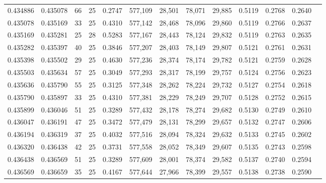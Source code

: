\begin{tabular}{rrrrrrrrrrrrr}
0.434886 & 0.435078 &    66 &  25 &                                     0.2747 & 577,109 &  28,501 &  78,071 &  29,885 & 0.5119 & 0.2768 & 0.2640 \\
0.435078 & 0.435169 &    33 &  25 &                                     0.4310 & 577,142 &  28,468 &  78,096 &  29,860 & 0.5119 & 0.2766 & 0.2637 \\
0.435169 & 0.435281 &    25 &  28 &                                     0.5283 & 577,167 &  28,443 &  78,124 &  29,832 & 0.5119 & 0.2763 & 0.2635 \\
0.435282 & 0.435397 &    40 &  25 &                                     0.3846 & 577,207 &  28,403 &  78,149 &  29,807 & 0.5121 & 0.2761 & 0.2631 \\
0.435398 & 0.435502 &    29 &  25 &                                     0.4630 & 577,236 &  28,374 &  78,174 &  29,782 & 0.5121 & 0.2759 & 0.2628 \\
0.435503 & 0.435634 &    57 &  25 &                                     0.3049 & 577,293 &  28,317 &  78,199 &  29,757 & 0.5124 & 0.2756 & 0.2623 \\
0.435636 & 0.435790 &    55 &  25 &                                     0.3125 & 577,348 &  28,262 &  78,224 &  29,732 & 0.5127 & 0.2754 & 0.2618 \\
0.435790 & 0.435897 &    33 &  25 &                                     0.4310 & 577,381 &  28,229 &  78,249 &  29,707 & 0.5128 & 0.2752 & 0.2615 \\
0.435899 & 0.436046 &    51 &  25 &                                     0.3289 & 577,432 &  28,178 &  78,274 &  29,682 & 0.5130 & 0.2749 & 0.2610 \\
0.436047 & 0.436191 &    47 &  25 &                                     0.3472 & 577,479 &  28,131 &  78,299 &  29,657 & 0.5132 & 0.2747 & 0.2606 \\
0.436194 & 0.436319 &    37 &  25 &                                     0.4032 & 577,516 &  28,094 &  78,324 &  29,632 & 0.5133 & 0.2745 & 0.2602 \\
0.436320 & 0.436438 &    42 &  25 &                                     0.3731 & 577,558 &  28,052 &  78,349 &  29,607 & 0.5135 & 0.2743 & 0.2598 \\
0.436438 & 0.436569 &    51 &  25 &                                     0.3289 & 577,609 &  28,001 &  78,374 &  29,582 & 0.5137 & 0.2740 & 0.2594 \\
0.436569 & 0.436659 &    35 &  25 &                                     0.4167 & 577,644 &  27,966 &  78,399 &  29,557 & 0.5138 & 0.2738 & 0.2590 \\

\end{tabular}

